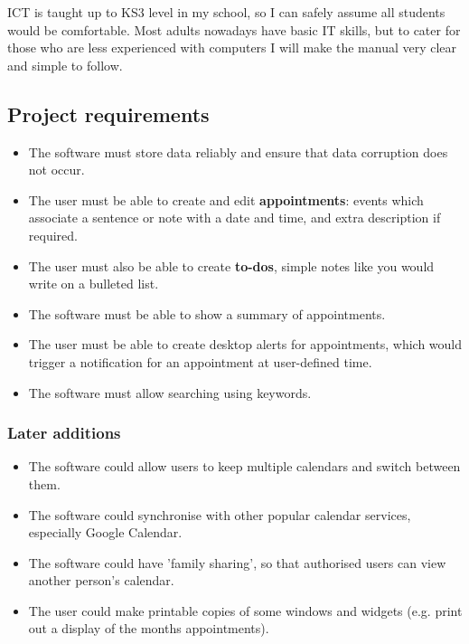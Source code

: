 ICT is taught up to KS3 level in my school, so I can safely assume all students
would be comfortable. Most adults nowadays have basic IT skills, but to cater
for those who are less experienced with computers I will make the manual very
clear and simple to follow.


\subsection{Project requirements}

\begin{itemize}
  \item The software must store data reliably and ensure that data corruption
        does not occur.
  \item The user must be able to create and edit \textbf{appointments}: events
        which associate a sentence or note with a date and time, and extra
        description if required.
  \item The user must also be able to create \textbf{to-dos}, simple notes like
        you would write on a bulleted list.
  \item The software must be able to show a summary of appointments.
\end{itemize}

\begin{itemize}
  \item The user must be able to create desktop alerts for appointments, which
        would trigger a notification for an appointment at user-defined time.
  \item The software must allow searching using keywords.
\end{itemize}

\subsubsection{Later additions}
\begin{itemize}
  \item The software could allow users to keep multiple calendars and switch
        between them.
  \item The software could synchronise with other popular calendar services,
        especially Google Calendar.
  \item The software could have 'family sharing', so that authorised users can
        view another person's calendar.
  \item The user could make printable copies of some windows and widgets
        (e.g. print out a display of the months appointments).
\end{itemize}

